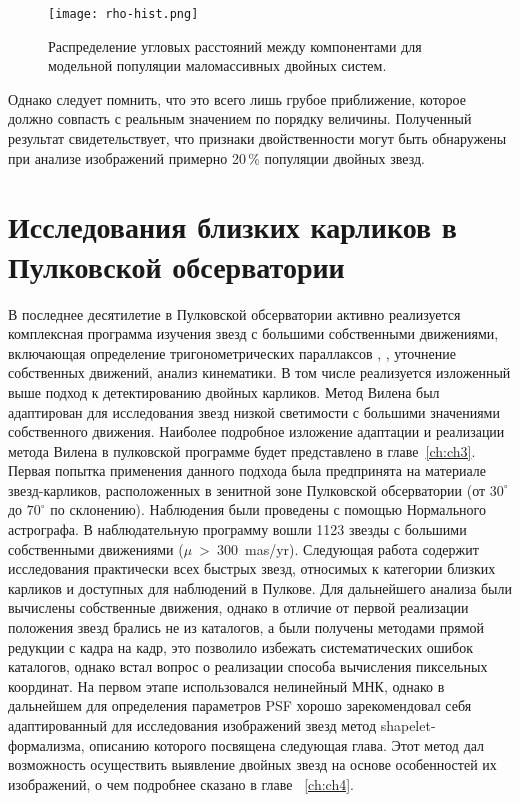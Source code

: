 \begin{figure}[pt]\label{fig:rho-hist}
\centering
\texttt{[image: rho-hist.png]}
\caption{ Распределение угловых расстояний между компонентами для модельной популяции маломассивных двойных систем.}
\end{figure}

Однако следует помнить, что это всего лишь грубое приближение, которое должно совпасть с реальным значением по порядку величины. Полученный результат свидетельствует, что признаки двойственности могут быть обнаружены при анализе изображений примерно 20\,\% популяции двойных звезд.

\section{Исследования близких карликов в Пулковской обсерватории} \label{sec:ch1/sec4}
В последнее десятилетие в Пулковской обсерватории активно реализуется комплексная программа изучения звезд с большими собственными движениями, включающая определение тригонометрических параллаксов  \cite{2010AstL...36..576K}, \cite{2013MNRAS.435.1083K}, уточнение собственных движений, анализ кинематики. В том числе реализуется изложенный выше подход к детектированию двойных карликов. Метод Вилена был адаптирован для исследования звезд низкой светимости с большими значениями собственного движения. Наиболее подробное изложение адаптации и реализации метода Вилена в пулковской программе будет представлено в главе~\ref{ch:ch3}. Первая попытка применения данного подхода \cite{2011AstL...37..420K} была предпринята на материале звезд-карликов, расположенных в зенитной зоне Пулковской обсерватории (от $30^\circ$ до $70^\circ$ по склонению). Наблюдения были проведены с помощью Нормального астрографа. В наблюдательную программу вошли 1123 звезды с большими собственными движениями ($\mu$~>~300~mas/yr). Следующая работа \cite{2015AstL...41..833K} содержит исследования практически всех быстрых звезд, относимых к категории близких карликов и доступных для наблюдений в Пулкове. Для дальнейшего анализа были вычислены собственные движения, однако в отличие от первой реализации положения звезд брались не из каталогов, а были получены методами прямой редукции с кадра на кадр, это позволило избежать систематических ошибок каталогов, однако встал вопрос о реализации способа вычисления пиксельных координат. На первом этапе использовался нелинейный МНК, однако в дальнейшем для определения параметров PSF хорошо зарекомендовал себя адаптированный для исследования изображений звезд метод shapelet-формализма, описанию которого посвящена следующая глава. Этот метод дал возможность осуществить выявление двойных звезд на основе особенностей их изображений, о чем подробнее сказано в главе ~\ref{ch:ch4}.